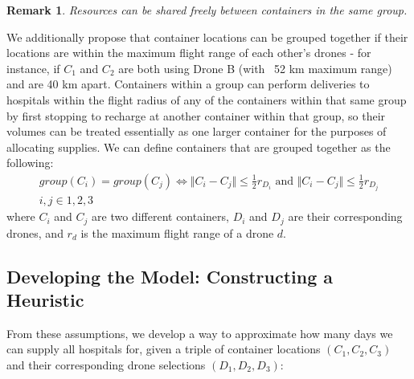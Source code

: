 \newtheorem*{remark}{Remark}
\begin{remark}
Resources can be shared freely between containers in the same group. \end{remark}
We additionally propose that container locations can be grouped together if their locations are within the maximum flight range of each other's drones - for instance, if $C_1$ and $C_2$ are both using Drone B (with ~52 km maximum range) and are 40 km apart. Containers within a group can perform deliveries to hospitals within the flight radius of any of the containers within that same group by first stopping to recharge at another container within that group, so their volumes can be treated essentially as one larger container for the purposes of allocating supplies. We can define containers that are grouped together as the following:
\begin{align*}
    group(C_i) = group(C_j) \iff \Vert C_i - C_j \Vert \leq \frac{1}{2} r_{D_i} \text{ and } \Vert C_i - C_j \Vert \leq \frac{1}{2} r_{D_j} \\
    i, j \in {1, 2, 3}
\end{align*}
where $C_i$ and $C_j$ are two different containers, $D_i$ and $D_j$ are their corresponding drones, and $r_d$ is the maximum flight range of a drone $d$.

\subsection{Developing the Model: Constructing a Heuristic}
From these assumptions, we develop a way to approximate how many days we can supply all hospitals for, given a triple of container locations $(C_1, C_2, C_3)$ and their corresponding drone selections $(D_1, D_2, D_3)$:  

